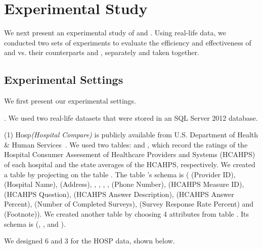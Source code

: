 \newcommand{\dblp}{{\sc Dblp}\xspace}
\newcommand{\hosp}{{\sc Hosp}\xspace}



\section{Experimental Study}
\label{sec-exp}

We next present an experimental study of \pCFDs and \pCINDs. Using real-life data, we conducted two sets of experiments to evaluate the efficiency and effectiveness of \pCFDs and \pCINDs vs. their counterparts \CFDs and \CINDs, separately and taken together.

\subsection{Experimental Settings}
We first present our experimental settings.

. We used two real-life datasets that were stored in an SQL Server 2012 database.

\ni(1) \hosp \textit{(Hospital Compare)} is publicly available from U.S. Department of Health
\& Human Services~\cite{hosp}. We used two tables:  and , which record the ratings of the Hospital Consumer Assessment of Healthcare Providers and Systems (HCAHPS) of each hospital and the state averages of the HCAHPS, respectively. We created a table  by projecting on the table . The table 's schema is ( (Provider ID),  (Hospital Name),  (Address), , , , ,  (Phone Number),  (HCAHPS Measure ID),  (HCAHPS Question),  (HCAHPS Answer Description),  (HCAHPS Answer Percent),  (Number of Completed Surveys),  (Survey Response Rate Percent) and  (Footnote)). We created another table  by choosing 4 attributes from table . Its schema is (, ,  and ).

We designed 6 \pCFDs and 3 \pCINDs for the HOSP data, shown below.

